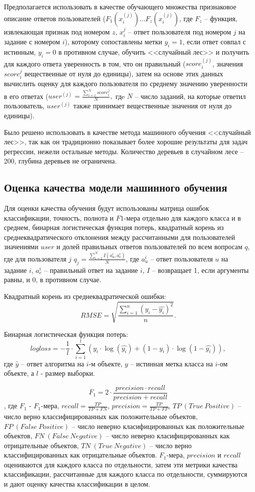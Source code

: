 \documentclass[specification,annotation,times]{itmo-student-thesis}
\begin{document}
Предполагается использовать в качестве обучающего множества признаковое описание ответов пользователей ($F_{1}(x_{i}^{(j)})\dots F_{z}(x_{i}^{(j)})$, где $F_{z}$ -- функция, извлекающая признак под номером $z$, $x_{i}^{j}$ -- ответ пользователя под номером $j$ на задание с номером $i$), которому сопоставлены метки $y_{i}=1$, если ответ совпал с истинным, $y_{i}=0$ в противном случае, обучить <<случайный лес>> и получить для каждого ответа уверенность в том, что он правильный ($score_{i}^{(j)}$, значения $score_{i}^{j}$ вещественные от нуля до единицы), затем на основе этих данных вычислить оценку для каждого пользователя по среднему значению уверенности в его ответах ($user^{(j)}=\frac{\sum_{i=1}^{N}score_i^{j}}{N},$ гдe $N$ -- число заданий, на которые ответил пользователь, $user^{(j)}$ также принимает вещественные значения от нуля до единицы). 

Было решено использовать в качестве метода машинного обучения <<случайный лес>>, так как он традиционно показывает более хорошие результаты для задач регрессии, нежели остальные методы. Количество деревьев в случайном лесе -- 200, глубина деревьев не ограничена.

\subsection{Оценка качества модели машинного обучения}

Для оценки качества обучения будут использованы матрица ошибок классификации, точность, полнота и $F1$-мера отдельно для каждого класса и в среднем, бинарная логистическая функция потерь, квадратный корень из среднеквадратического отклонения между рассчитанными для пользователей значениями $user$ и долей правильных ответов пользователей по всем вопросам $q$, где для пользователя $j$ $q_{j} = \frac{\sum_{i=1}^{N}I(a_{u}^{i}, a_{c}^{i})}{N}$, где $a_{u}^{i}$ -- ответ пользователя $u$ на задание $i$, $a_{c}^{i}$ -- правильный ответ на задание $i$, $I$ -- возвращает 1, если аргументы равны, и 0, в противном случае.

Квадратный корень из среднеквадратической ошибки:
\[RMSE=\sqrt{\frac{\sum_{i=1}^{n}(y_{i} - \hat{y_{i}})^{2}}{n}}.\]

Бинарная логистическая функция потерь:
\[logloss=-\frac{1}{l}\cdot\sum_{i=1}^{l}(y_{i}\cdot\log(\hat{y_{i}}) + 
(1-y_{i})\cdot\log(1-\hat{y_{i}})),\] где $\hat{y}$ -- ответ алгоритма на $i$-м объекте, $y$ -- истинная метка класса на $i$-ом объекте, а $l$ - размер выборки.

\[F_{1}=2\cdot\frac{precision\cdot recall}{precision + recall}\], где $F_{1}$ - $F_{1}$-мера, $recall=\frac{TP}{TP+FN}$, $precision = \frac{TP}{TP+FP}$, $TP\ (True\ Positive)$ -- число верно классифицированных как положительные объектов, $FP\ (False\ Positive)$ -- число неверно класифицированных как положительные объектов, $FN\ (False\ Negative)$ -- число неверно класифицированных как отрицательные объектов, $TN\ (True\ Negative)$ -- число верно классифицированных как отрицательные объектов. $F_{1}$-мера, $precision$ и $recall$ оцениваются для каждого класса по отдельности, затем эти метрики качества классификации, рассчитанные для каждого класса по отдельности, суммируются и дают оценку качества классификации в целом.
\end{document}
